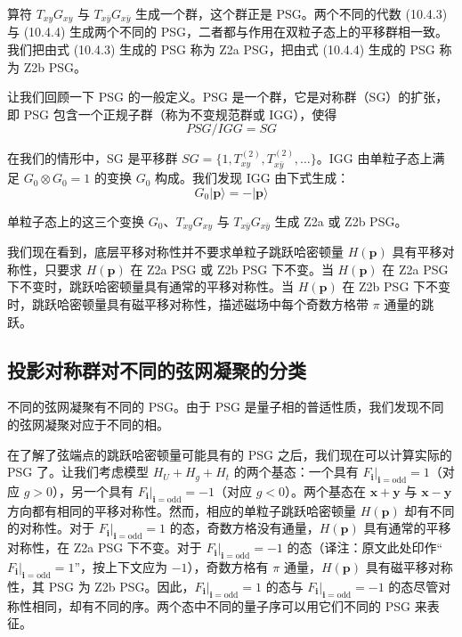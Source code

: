 算符 $T_{xy}G_{xy}$ 与 $T_{x\bar{y}}G_{x\bar{y}}$ 生成一个群，这个群正是 PSG。两个不同的代数 (10.4.3) 与 (10.4.4) 生成两个不同的 PSG，二者都与作用在双粒子态上的平移群相一致。我们把由式 (10.4.3) 生成的 PSG 称为 Z2a PSG，把由式 (10.4.4) 生成的 PSG 称为 Z2b PSG。

让我们回顾一下 PSG 的一般定义。PSG 是一个群，它是对称群（SG）的扩张，即 PSG 包含一个正规子群（称为不变规范群或 IGG），使得
\begin{equation*}
PSG/IGG=SG
\end{equation*}

在我们的情形中，SG 是平移群 $SG=\{1,T_{xy}^{(2)},T_{x\bar{y}}^{(2)},\dots\}$。IGG 由单粒子态上满足 $G_0\otimes G_0=1$ 的变换 $G_0$ 构成。我们发现 IGG 由下式生成：
\begin{equation*}
G_0|\pmb{p}\rangle=-|\pmb{p}\rangle
\end{equation*}

单粒子态上的这三个变换 $G_0$、$T_{xy}G_{xy}$ 与 $T_{x\bar{y}}G_{x\bar{y}}$ 生成 Z2a 或 Z2b PSG。

我们现在看到，底层平移对称性并不要求单粒子跳跃哈密顿量 $H(\pmb{p})$ 具有平移对称性，只要求 $H(\pmb{p})$ 在 Z2a PSG 或 Z2b PSG 下不变。当 $H(\pmb{p})$ 在 Z2a PSG 下不变时，跳跃哈密顿量具有通常的平移对称性。当 $H(\pmb{p})$ 在 Z2b PSG 下不变时，跳跃哈密顿量具有磁平移对称性，描述磁场中每个奇数方格带 $\pi$ 通量的跳跃。

\subsection{投影对称群对不同的弦网凝聚的分类}

\begin{keypoints}\item 不同的弦网凝聚有不同的 PSG。由于 PSG 是量子相的普适性质，我们发现不同的弦网凝聚对应于不同的相。\end{keypoints}

在了解了弦端点的跳跃哈密顿量可能具有的 PSG 之后，我们现在可以计算实际的 PSG 了。让我们考虑模型 $H_U+H_g+H_t$ 的两个基态：一个具有 $F_{\pmb{i}}\big|_{\pmb{i}=\mathrm{odd}}=1$（对应 $g>0$），另一个具有 $F_{\pmb{i}}\big|_{\pmb{i}=\mathrm{odd}}=-1$（对应 $g<0$）。两个基态在 $\pmb{x}+\pmb{y}$ 与 $\pmb{x}-\pmb{y}$ 方向都有相同的平移对称性。然而，相应的单粒子跳跃哈密顿量 $H(\pmb{p})$ 却有不同的对称性。对于 $F_{\pmb{i}}\big|_{\pmb{i}=\mathrm{odd}}=1$ 的态，奇数方格没有通量，$H(\pmb{p})$ 具有通常的平移对称性，在 Z2a PSG 下不变。对于 $F_{\pmb{i}}\big|_{\pmb{i}=\mathrm{odd}}=-1$ 的态（译注：原文此处印作“$F_{\pmb{i}}|_{\pmb{i}=\mathrm{odd}}=1$”，按上下文应为 $-1$），奇数方格有 $\pi$ 通量，$H(\pmb{p})$ 具有磁平移对称性，其 PSG 为 Z2b PSG。因此，$F_{\pmb{i}}\big|_{\pmb{i}=\mathrm{odd}}=1$ 的态与 $F_{\pmb{i}}\big|_{\pmb{i}=\mathrm{odd}}=-1$ 的态尽管对称性相同，却有不同的序。两个态中不同的量子序可以用它们不同的 PSG 来表征。

